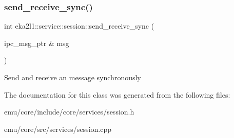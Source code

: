 \subsubsection{\texorpdfstring{send\+\_\+receive\+\_\+sync()}{send\_receive\_sync()}}
{\footnotesize\ttfamily int eka2l1\+::service\+::session\+::send\+\_\+receive\+\_\+sync (\begin{DoxyParamCaption}\item[{ipc\+\_\+msg\+\_\+ptr \&}]{msg }\end{DoxyParamCaption})}

Send and receive an message synchronously 

The documentation for this class was generated from the following files\+:\begin{DoxyCompactItemize}
\item 
emu/core/include/core/services/session.\+h\item 
emu/core/src/services/session.\+cpp\end{DoxyCompactItemize}
